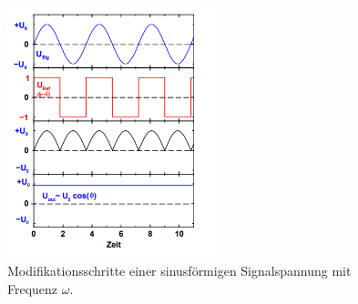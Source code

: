 \begin{figure}
    \centering
    \includegraphics[width=0.54\textwidth]{bilder/theo2.png}
    \caption{Modifikationsschritte einer sinusförmigen Signalspannung mit Frequenz $\omega$.} 
    \label{fig:theo2}
\end{figure}